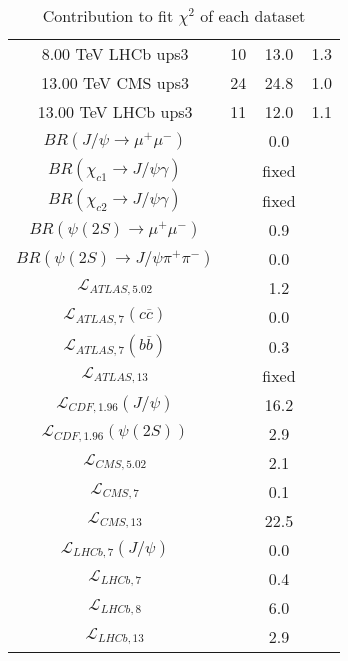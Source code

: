 \begin{table}[h!]
\begin{tabular}{c|c|c|c}
8.00 TeV LHCb ups3 & 10 & 13.0 & 1.3 \\
13.00 TeV CMS ups3 & 24 & 24.8 & 1.0 \\
13.00 TeV LHCb ups3 & 11 & 12.0 & 1.1 \\
\hline
$BR(J/\psi\rightarrow\mu^+\mu^-)$ &  & 0.0 &  \\
$BR(\chi_{c1}\rightarrow J/\psi\gamma)$ &  & fixed & \\
$BR(\chi_{c2}\rightarrow J/\psi\gamma)$ &  & fixed & \\
$BR(\psi(2S)\rightarrow\mu^+\mu^-)$ &  & 0.9 &  \\
$BR(\psi(2S)\rightarrow J/\psi\pi^+\pi^-)$ &  & 0.0 &  \\
$\mathcal L_{ATLAS,5.02}$ &  & 1.2 &  \\
$\mathcal L_{ATLAS,7}(c\overline c)$ &  & 0.0 &  \\
$\mathcal L_{ATLAS,7}(b\overline b)$ &  & 0.3 &  \\
$\mathcal L_{ATLAS,13}$ &  & fixed & \\
$\mathcal L_{CDF,1.96}(J/\psi)$ &  & 16.2 &  \\
$\mathcal L_{CDF,1.96}(\psi(2S))$ &  & 2.9 &  \\
$\mathcal L_{CMS,5.02}$ &  & 2.1 &  \\
$\mathcal L_{CMS,7}$ &  & 0.1 &  \\
$\mathcal L_{CMS,13}$ &  & 22.5 &  \\
$\mathcal L_{LHCb,7}(J/\psi)$ &  & 0.0 &  \\
$\mathcal L_{LHCb,7}$ &  & 0.4 &  \\
$\mathcal L_{LHCb,8}$ &  & 6.0 &  \\
$\mathcal L_{LHCb,13}$ &  & 2.9 &  \\
\end{tabular}
\caption{Contribution to fit $\chi^2$ of each dataset}
\end{table}

